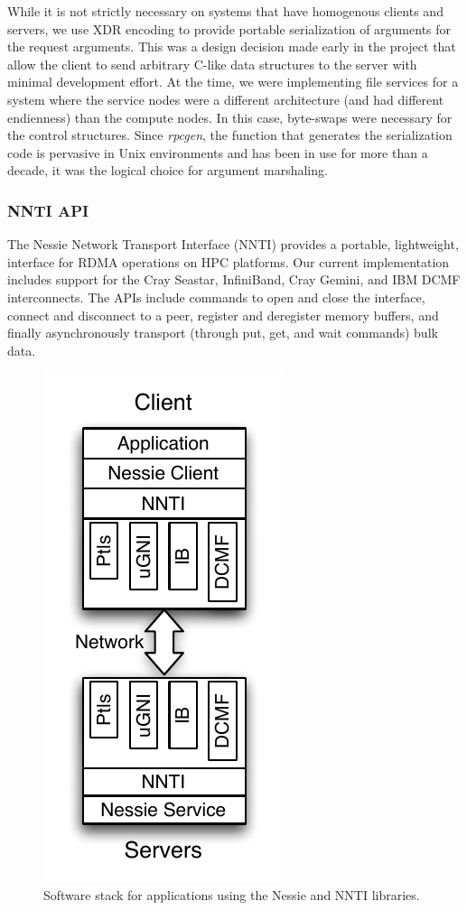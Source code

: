 While it is not strictly necessary on systems that have homogenous clients and servers, we 
use XDR encoding to provide portable serialization of arguments for the request arguments. 
This was a design decision made early in the project that allow the client to
send arbitrary C-like data structures to the server with minimal development effort.  At 
the time, we were implementing file services for a system where the service nodes were
a different architecture (and had different endienness) than the compute nodes.  In this 
case, byte-swaps were necessary for the control structures.  Since
\emph{rpcgen}, the function that generates the serialization code is pervasive in Unix
environments and has been in use for more than a decade, it was the logical choice for 
argument marshaling.  

\subsubsection{NNTI API}

The Nessie Network Transport Interface (NNTI) provides a portable, lightweight,
interface for RDMA operations on HPC platforms.  Our current
implementation includes support for the Cray Seastar, InfiniBand,
Cray Gemini, and IBM DCMF interconnects.  The APIs include commands
to open and close the interface, connect and disconnect to a peer,
register and deregister memory buffers, and finally asynchronously transport
(through put, get, and wait commands) bulk data. 

\begin{figure}
\begin{centering}
\includegraphics{figures/NSSISoftwareStack}
\par\end{centering}
\caption{Software stack for applications using the Nessie and NNTI libraries.}
\end{figure}



